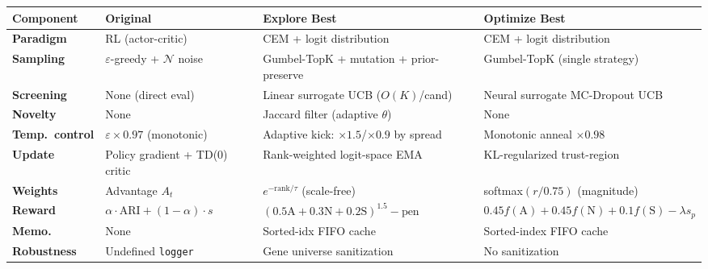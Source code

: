 \documentclass[8pt]{article}
\begin{document}
\renewcommand{\arraystretch}{1.25}
\begin{table}[ht]
\centering
\small
\begin{tabular}{@{}p{2.0cm} p{3.5cm} p{4.4cm} p{4.4cm}@{}}
\toprule
\textbf{Component} & \textbf{Original} & \textbf{Explore Best} & \textbf{Optimize Best} \\
\midrule
\textbf{Paradigm} &
    RL (actor-critic) &
    \textcolor{added}{CEM + logit distribution} &
    \textcolor{addedB}{CEM + logit distribution} \\
\addlinespace

\textbf{Sampling} &
    $\varepsilon$-greedy + $\mathcal{N}$ noise &
    \textcolor{added}{Gumbel-TopK + mutation + prior-preserve} &
    \textcolor{addedB}{Gumbel-TopK (single strategy)} \\
\addlinespace

\textbf{Screening} &
    None (direct eval) &
    \textcolor{added}{Linear surrogate UCB ($O(K)$/cand)} &
    \textcolor{addedB}{Neural surrogate MC-Dropout UCB} \\
\addlinespace

\textbf{Novelty} &
    None &
    \textcolor{added}{Jaccard filter (adaptive $\theta$)} &
    None \\
\addlinespace

\textbf{Temp.\ control} &
    $\varepsilon \times 0.97$ (monotonic) &
    \textcolor{added}{Adaptive kick: $\times 1.5$/$\times 0.9$ by spread} &
    \textcolor{addedB}{Monotonic anneal $\times 0.98$} \\
\addlinespace

\textbf{Update} &
    Policy gradient + TD(0) critic &
    \textcolor{added}{Rank-weighted logit-space EMA} &
    \textcolor{addedB}{KL-regularized trust-region} \\
\addlinespace

\textbf{Weights} &
    Advantage $A_t$ &
    \textcolor{added}{$e^{-\text{rank}/\tau}$ (scale-free)} &
    \textcolor{addedB}{softmax$(r/0.75)$ (magnitude)} \\
\addlinespace

\textbf{Reward} &
    $\alpha \cdot \text{ARI} + (1{-}\alpha) \cdot s$ &
    \textcolor{added}{$(0.5\text{A}+0.3\text{N}+0.2\text{S})^{1.5} - \text{pen}$} &
    \textcolor{addedB}{$0.45 f(\text{A})+0.45 f(\text{N})+0.1 f(\text{S}) - \lambda s_p$} \\
\addlinespace

\textbf{Memo.} &
    None &
    \textcolor{added}{Sorted-idx FIFO cache} &
    \textcolor{addedB}{Sorted-index FIFO cache} \\
\addlinespace

\textbf{Robustness} &
    Undefined \texttt{logger} &
    \textcolor{added}{Gene universe sanitization} &
    No sanitization \\

\bottomrule
\end{tabular}
\end{table}
\end{document}
